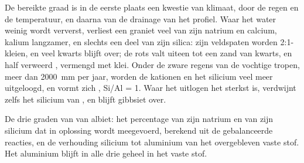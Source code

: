 De bereikte graad is in de eerste plaats een kwestie van klimaat, door de regen en de temperatuur, en daarna van de drainage van het profiel. Waar het water weinig wordt ververst, verliest een graniet veel van zijn natrium en calcium, kalium langzamer, en slechts een deel van zijn silica: zijn veldspaten worden 2:1-kleien, en veel kwarts blijft over; de rots valt uiteen tot een zand van kwarts,  en half verweerd , vermengd met klei. Onder de zware regens van de vochtige tropen, meer dan \qty{2000}{mm} per jaar, worden de kationen en het silicium veel meer uitgeloogd, en vormt zich , Si/Al = 1. Waar het uitlogen het sterkst is, verdwijnt zelfs het silicium van , en blijft gibbsiet over.

\begin{omfigure}

{\small De drie graden van  van albiet: het percentage van zijn natrium en van zijn silicium dat in oplossing wordt meegevoerd, berekend uit de gebalanceerde reacties, en de verhouding silicium tot aluminium van het overgebleven vaste stof. Het aluminium blijft in alle drie geheel in het vaste stof.}
\label{fig:b1:weathering-clays:degrees}
\end{omfigure}


